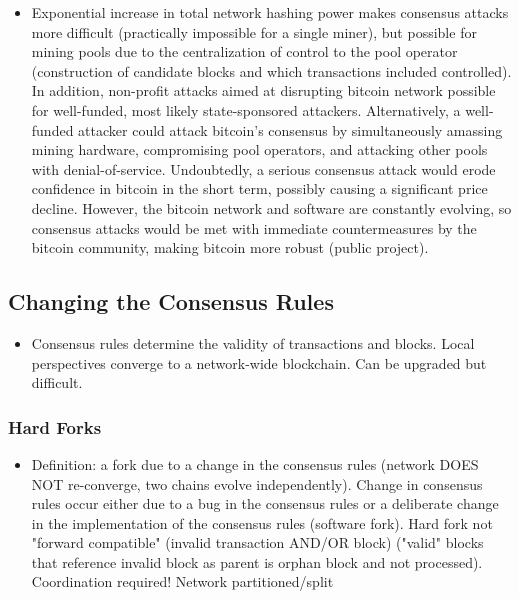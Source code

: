 \documentclass[english, 11pt]{article}
\begin{document}
\begin{itemize}
    \item Exponential increase in total network hashing power makes consensus attacks more difficult (practically impossible for a single miner), but possible for mining pools due to the centralization of control to the pool operator (construction of candidate blocks and which transactions included controlled). In addition, non-profit attacks aimed at disrupting bitcoin network possible for well-funded, most likely state-sponsored attackers.  Alternatively, a well-funded attacker could attack bitcoin’s consensus by simultaneously amassing mining hardware, compromising pool operators, and attacking other pools with denial-of-service. Undoubtedly, a serious consensus attack would erode confidence in bitcoin in the short term, possibly causing a significant price decline. However, the bitcoin network and software are constantly evolving, so consensus attacks would be met with immediate countermeasures by the bitcoin community, making bitcoin more robust (public project).
\end{itemize}

\subsection{Changing the Consensus Rules}
\begin{itemize}
    \item Consensus rules determine the validity of transactions and blocks. Local perspectives converge to a network-wide blockchain. Can be upgraded but difficult.
\end{itemize}
\subsubsection{Hard Forks}
\begin{itemize}
    \item Definition: a fork due to a change in the consensus rules (network DOES NOT re-converge, two chains evolve independently). Change in consensus rules occur either due to a bug in the consensus rules or a deliberate change in the implementation of the consensus rules (software fork). Hard fork not "forward compatible" (invalid transaction AND/OR block) ("valid" blocks that reference invalid block as parent is orphan block and not processed). Coordination required! Network partitioned/split
\end{itemize}
\end{document}

